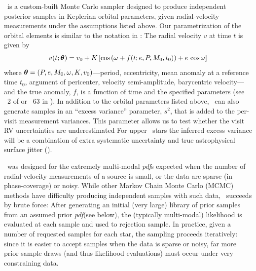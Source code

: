 \documentclass[modern, letterpaper]{aastex62}
\newcommand{\thejoker}{\project{The~Joker}}
\newcommand{\RGB}{\acronym{RGB}}
\newcommand{\pdf}{\textit{pdf}}
\begin{document}
\thejoker\ is a custom-built Monte Carlo sampler designed to produce independent
posterior samples in Keplerian orbital parameters, given radial-velocity
measurements under the assumptions listed above.
Our parametrization of the orbital elements is similar to the notation in
\citet{Murray:2010}:
The radial velocity $v$ at time $t$ is given by
\begin{equation}
  v(t;\bs{\theta}) = v_0 + K\,[\cos\left(\omega + f(t; e, P, M_0, t_0)\right) +
    e\,\cos\omega]
\end{equation}
where $\boldsymbol{\theta} = (P,e,M_0,\omega,K,v_0)$---period, eccentricity, mean
anomaly at a reference time $t_0$, argument of pericenter, velocity
semi-amplitude, barycentric velocity---and the true anomaly, $f$, is a function
of time and the specified parameters (see \sectionname~2 of
\citealt{Price-Whelan:2017} or \eqname~63 in \citealt{Murray:2010}).
In addition to the orbital parameters listed above, \thejoker\ can also generate
samples in an ``excess variance'' parameter, $s^2$, that is added to the
per-visit measurement variances.
This parameter allows us to test whether the visit RV uncertainties are
underestimated
For upper \RGB\ stars the inferred excess variance will be a combination of
extra systematic uncertainty and true astrophysical surface jitter
().

\thejoker\ was designed for the extremely multi-modal \pdf s expected when the
number of radial-velocity measurements of a source is small, or the data are
sparse (in phase-coverage) or noisy.
While other Markov Chain Monte Carlo (MCMC) methods have difficulty producing
independent samples with such data, \thejoker\ succeeds by brute force:
After generating an initial (very large) library of prior samples from an
assumed prior \pdf (see below), the (typically multi-modal) likelihood is
evaluated at each sample and used to rejection sample.
In practice, given a number of requested samples for each star, the sampling
proceeds iteratively: since it is easier to accept samples when the data is
sparse or noisy, far more prior sample draws (and thus likelihood evaluations)
must occur under very constraining data.

%
%
%
\end{document}
